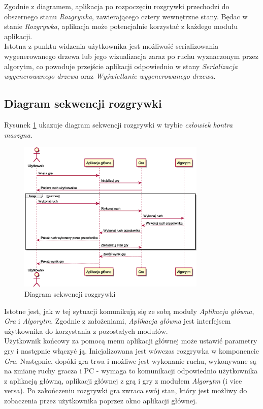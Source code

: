 \documentclass{article}
\newcommand{\modulename}[1]{\textit{#1}}
\begin{document}
	\noindent Zgodnie z diagramem, aplikacja po rozpoczęciu rozgrywki przechodzi do obszernego stanu \modulename{Rozgrywka}, zawierającego cztery wewnętrzne stany. Będac w stanie \modulename{Rozgrywka}, aplikacja może potencjalnie korzystać z każdego modułu aplikacji. \\
	
	\noindent Istotna z punktu widzenia użytkownika jest możliwość serializowania wygenerowanego drzewa lub jego wizualizacja zaraz po ruchu wyznaczonym przez algorytm, co powoduje przejście aplikacji odpowiednio w stany \modulename{Serializacja wygenerowanego drzewa} oraz \modulename{Wyświetlanie wygenerowanego drzewa}.
	\clearpage
	
	\subsection{Diagram sekwencji rozgrywki}
	Rysunek \ref{rys:sequencegame} ukazuje diagram sekwencji rozgrywki w trybie \modulename{człowiek kontra maszyna}.
	\begin{figure}[h]
		\centering
		\includegraphics[width=0.8\textwidth]{play_with_pc_sequence}
		\caption{Diagram sekwencji rozgrywki}
		\label{rys:sequencegame}
	\end{figure}

	\noindent Istotne jest, jak w tej sytuacji komunikują się ze sobą moduły \modulename{Aplikacja główna}, \modulename{Gra} i \modulename{Algorytm}. Zgodnie z założeniami, \modulename{Aplikacja główna} jest interfejsem użytkownika do korzystania z pozostałych modułów.\\
	
	\noindent Użytkownik końcowy za pomocą menu aplikacji głównej może ustawić parametry gry i następnie włączyć ją. Inicjalizowana jest wówczas rozgrywka w komponencie \textit{Gra}. Następnie, dopóki gra trwa i możliwe jest wykonanie ruchu, wykonywane są na zmianę ruchy gracza i PC - wymaga to komunikacji odpowiednio użytkownika z aplikacją główną, aplikacji głównej z grą i gry z modułem \modulename{Algorytm} (i vice versa). Po zakończeniu rozgrywki gra zwraca swój stan, który jest możliwy do zobaczenia przez użytkownika poprzez okno aplikacji głównej.\\
	
\end{document}
